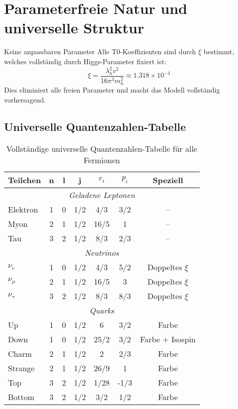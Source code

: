 \documentclass[12pt,a4paper]{article}
\begin{document}
	\section{Parameterfreie Natur und universelle Struktur}
	\label{sec:parameterfreie_natur}
	
	\begin{important}{Keine anpassbaren Parameter}{}
		Alle T0-Koeffizienten sind durch $\xi$ bestimmt, welches vollständig durch Higgs-Parameter fixiert ist:
		\begin{equation}
			\xi = \frac{\lambda_h^2 v^2}{16\pi^3 m_h^2} \approx 1.318 \times 10^{-4}
		\end{equation}
		Dies eliminiert alle freien Parameter und macht das Modell vollständig vorhersagend.
	\end{important}
	
	\subsection{Universelle Quantenzahlen-Tabelle}
	\label{subsec:universal_quantum_table}
	
	\begin{table}[H]
		\centering
		\begin{tabular}{lcccccc}
			\toprule
			\textbf{Teilchen} & \textbf{n} & \textbf{l} & \textbf{j} & \textbf{$r_i$} & \textbf{$p_i$} & \textbf{Speziell} \\
			\midrule
			\multicolumn{7}{c}{\textit{Geladene Leptonen}} \\
			\midrule
			Elektron & 1 & 0 & 1/2 & 4/3 & 3/2 & -- \\
			Myon & 2 & 1 & 1/2 & 16/5 & 1 & -- \\
			Tau & 3 & 2 & 1/2 & 8/3 & 2/3 & -- \\
			\midrule
			\multicolumn{7}{c}{\textit{Neutrinos}} \\
			\midrule
			$\nu_e$ & 1 & 0 & 1/2 & 4/3 & 5/2 & Doppeltes $\xi$ \\
			$\nu_\mu$ & 2 & 1 & 1/2 & 16/5 & 3 & Doppeltes $\xi$ \\
			$\nu_\tau$ & 3 & 2 & 1/2 & 8/3 & 8/3 & Doppeltes $\xi$ \\
			\midrule
			\multicolumn{7}{c}{\textit{Quarks}} \\
			\midrule
			Up & 1 & 0 & 1/2 & 6 & 3/2 & Farbe \\
			Down & 1 & 0 & 1/2 & 25/2 & 3/2 & Farbe + Isospin \\
			Charm & 2 & 1 & 1/2 & 2 & 2/3 & Farbe \\
			Strange & 2 & 1 & 1/2 & 26/9 & 1 & Farbe \\
			Top & 3 & 2 & 1/2 & 1/28 & -1/3 & Farbe \\
			Bottom & 3 & 2 & 1/2 & 3/2 & 1/2 & Farbe \\
			\bottomrule
		\end{tabular}
		\caption{Vollständige universelle Quantenzahlen-Tabelle für alle Fermionen}
		\label{tab:universal_quantum_numbers}
	\end{table}
	
\end{document}

